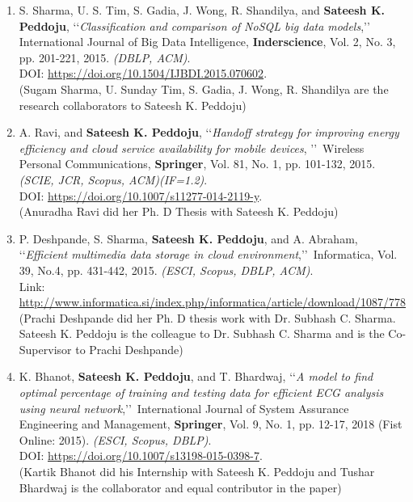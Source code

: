 \begin{enumerate}
	\item
	S. Sharma, U. S. Tim, S. Gadia, J. Wong, R. Shandilya, and \textbf{Sateesh K. Peddoju}, \lq\lq \textit{Classification and comparison of NoSQL big data models},\rq\rq\, International Journal of Big Data Intelligence, \textbf{Inderscience}, Vol. 2, No. 3, pp. 201-221, 2015. \emph{(DBLP, ACM)}. \\DOI: \url{https://doi.org/10.1504/IJBDI.2015.070602}.
\\(Sugam Sharma, U. Sunday Tim, S. Gadia, J. Wong, R. Shandilya are the research collaborators to Sateesh K. Peddoju)	
	
	\item
	A. Ravi, and \textbf{Sateesh K. Peddoju}, \lq\lq \textit{Handoff strategy for improving energy efficiency and cloud service availability for mobile devices}, \rq\rq\, Wireless Personal Communications, \textbf{Springer}, Vol. 81, No. 1, pp. 101-132, 2015. \emph{(SCIE, JCR, Scopus, ACM)(IF=1.2)}. \\DOI: \url{https://doi.org/10.1007/s11277-014-2119-y}. \\(Anuradha Ravi did her Ph. D Thesis with Sateesh K. Peddoju)
	
	
	\item
	P. Deshpande, S. Sharma, \textbf{Sateesh K. Peddoju}, and A. Abraham, \lq\lq \textit{Efficient multimedia data storage in cloud environment},\rq\rq\, Informatica, Vol. 39, No.4, pp. 431-442, 2015. \emph{(ESCI, Scopus, DBLP, ACM)}. \\Link: \url{http://www.informatica.si/index.php/informatica/article/download/1087/778} \\(Prachi Deshpande did her Ph. D thesis work with Dr. Subhash C. Sharma. Sateesh K. Peddoju is the colleague to Dr. Subhash C. Sharma and is the Co-Supervisor to Prachi Deshpande)
	
	\item
	K. Bhanot, \textbf{Sateesh K. Peddoju}, and T. Bhardwaj, \lq\lq \textit{A model to find optimal percentage of training and testing data for efficient ECG analysis using neural network},\rq\rq\, International Journal of System Assurance Engineering and Management, \textbf{Springer}, Vol. 9, No. 1, pp. 12-17, 2018 (Fist Online: 2015). \emph{(ESCI, Scopus, DBLP)}. \\DOI: \url{https://doi.org/10.1007/s13198-015-0398-7}.
\\ (Kartik Bhanot did his Internship with Sateesh K. Peddoju and Tushar Bhardwaj is the collaborator and equal contributor in the paper)
	

\end{enumerate}
